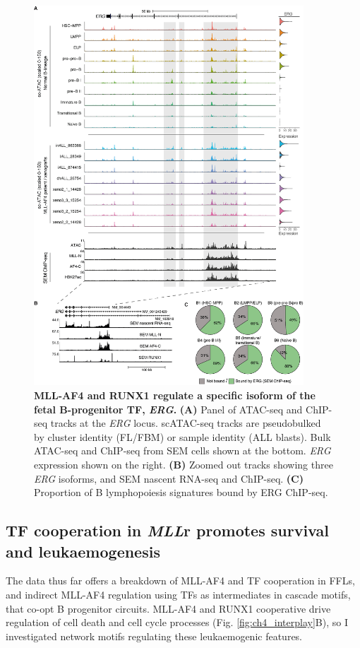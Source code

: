 \begin{figure}[p]
    \centering
    \includegraphics[width=0.9\textwidth,height=0.9\textheight,keepaspectratio]{figures/chapter4/ch4_multiome-erg.png}
    \caption[{MLL-AF4 and RUNX1 regulate a specific isoform of the fetal B-progenitor TF, \textit{ERG}.}]
    {\textbf{MLL-AF4 and RUNX1 regulate a specific isoform of the fetal B-progenitor TF, \textit{ERG}.} 
    \textbf{(A)} Panel of ATAC-seq and ChIP-seq tracks at the \textit{ERG} locus. scATAC-seq tracks are pseudobulked by cluster identity (FL/FBM) or sample identity (ALL blasts). Bulk ATAC-seq and ChIP-seq from SEM cells shown at the bottom. \textit{ERG} expression shown on the right.
    \textbf{(B)} Zoomed out tracks showing three \textit{ERG} isoforms, and SEM nascent RNA-seq and ChIP-seq.
    \textbf{(C)} Proportion of B lymphopoiesis signatures bound by ERG ChIP-seq.
    }
    \label{fig:ch4_multiome-erg}
\end{figure}

\subsection{TF cooperation in \textit{MLL}r promotes survival and leukaemogenesis}

The data thus far offers a breakdown of MLL-AF4 and TF cooperation in FFLs, and indirect MLL-AF4 regulation using TFs as intermediates in cascade motifs, that co-opt B progenitor circuits. MLL-AF4 and RUNX1 cooperative drive regulation of cell death and cell cycle processes (Fig. \ref{fig:ch4_interplay}B), so I investigated network motifs regulating these leukaemogenic features.